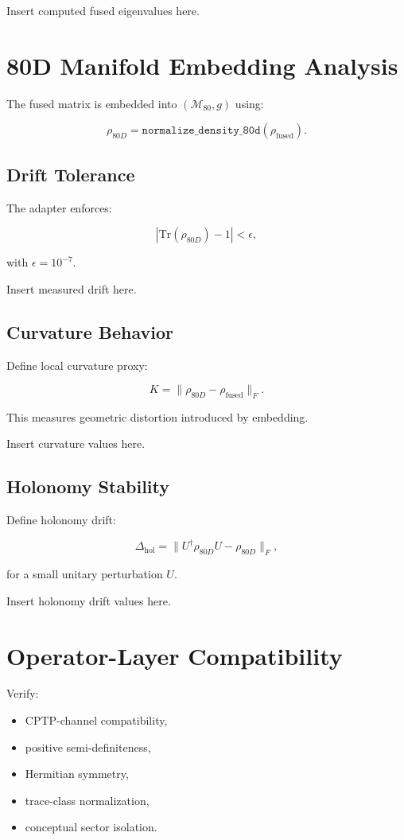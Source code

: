 \documentclass[11pt]{article}
\begin{document}
Insert computed fused eigenvalues here.

\section{80D Manifold Embedding Analysis}

The fused matrix is embedded into $(\mathcal{M}_{80}, g)$ using:

\[
\rho_{80D} = \texttt{normalize\_density\_80d}(\rho_{\text{fused}}).
\]

\subsection{Drift Tolerance}

The adapter enforces:

\[
|\mathrm{Tr}(\rho_{80D}) - 1| < \epsilon,
\]

with $\epsilon = 10^{-7}$.

Insert measured drift here.

\subsection{Curvature Behavior}

Define local curvature proxy:

\[
K = \|\rho_{80D} - \rho_{\text{fused}}\|_F.
\]

This measures geometric distortion introduced by embedding.

Insert curvature values here.

\subsection{Holonomy Stability}

Define holonomy drift:

\[
\Delta_{\text{hol}} = \|U^\dagger \rho_{80D} U - \rho_{80D}\|_F,
\]

for a small unitary perturbation $U$.

Insert holonomy drift values here.

\section{Operator-Layer Compatibility}

Verify:

\begin{itemize}
    \item CPTP-channel compatibility,
    \item positive semi-definiteness,
    \item Hermitian symmetry,
    \item trace-class normalization,
    \item conceptual sector isolation.
\end{itemize}
\end{document}
